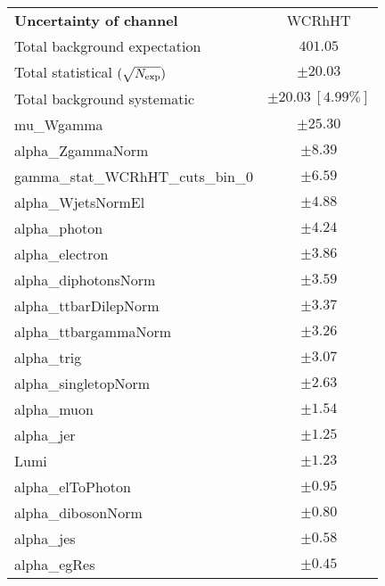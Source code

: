
\begin{table}
\begin{center}
\setlength{\tabcolsep}{0.0pc}
\begin{tabular*}{\textwidth}{@{\extracolsep{\fill}}lc}
\noalign{\smallskip}\hline\noalign{\smallskip}
{\bf Uncertainty of channel}                                    & WCRhHT            \\
\noalign{\smallskip}\hline\noalign{\smallskip}
Total background expectation             &  $401.05$       \\
\noalign{\smallskip}\hline\noalign{\smallskip}
Total statistical $(\sqrt{N_{\rm exp}})$              & $\pm 20.03$       \\
Total background systematic               & $\pm 20.03\ [4.99\%] $             \\
\noalign{\smallskip}\hline\noalign{\smallskip}
\noalign{\smallskip}\hline\noalign{\smallskip}
mu\_Wgamma         & $\pm 25.30$       \\
alpha\_ZgammaNorm         & $\pm 8.39$       \\
gamma\_stat\_WCRhHT\_cuts\_bin\_0         & $\pm 6.59$       \\
alpha\_WjetsNormEl         & $\pm 4.88$       \\
alpha\_photon         & $\pm 4.24$       \\
alpha\_electron         & $\pm 3.86$       \\
alpha\_diphotonsNorm         & $\pm 3.59$       \\
alpha\_ttbarDilepNorm         & $\pm 3.37$       \\
alpha\_ttbargammaNorm         & $\pm 3.26$       \\
alpha\_trig         & $\pm 3.07$       \\
alpha\_singletopNorm         & $\pm 2.63$       \\
alpha\_muon         & $\pm 1.54$       \\
alpha\_jer         & $\pm 1.25$       \\
Lumi         & $\pm 1.23$       \\
alpha\_elToPhoton         & $\pm 0.95$       \\
alpha\_dibosonNorm         & $\pm 0.80$       \\
alpha\_jes         & $\pm 0.58$       \\
alpha\_egRes         & $\pm 0.45$       \\

\end{tabular*}
\end{center}
\end{table}
